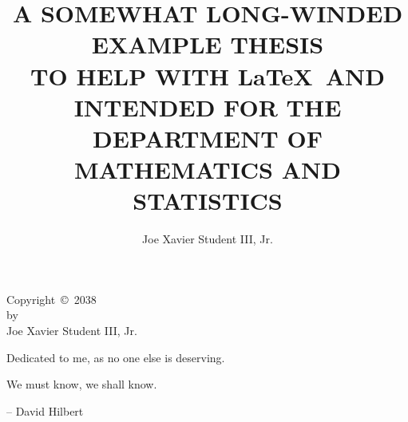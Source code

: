 \documentclass{sdsu-thesis}
\author{Joe Xavier Student III, Jr.}
\title{A SOMEWHAT LONG-WINDED \\
  EXAMPLE THESIS \\
  TO HELP WITH \LaTeX\  AND INTENDED FOR THE\\
  DEPARTMENT OF MATHEMATICS AND STATISTICS}
\theoremstyle{dtm}
\begin{document}
\maketitle

\makesignature

\begin{copyrightpage}
  Copyright~\copyright~2038 \\
  by \\
  Joe Xavier Student III, Jr.
\end{copyrightpage}


% 
\begin{dedication}
  \vspace{3in}
  \centering
  Dedicated to me, as no one else is deserving.
\end{dedication}


% 
\begin{epigraph}
  We must know, we shall know.\\
  \begin{flushright}
    -- David Hilbert
  \end{flushright}
\end{epigraph}


\begin{abstract}
  
\end{abstract}


\tableofcontents


\listoftables
\end{document}
